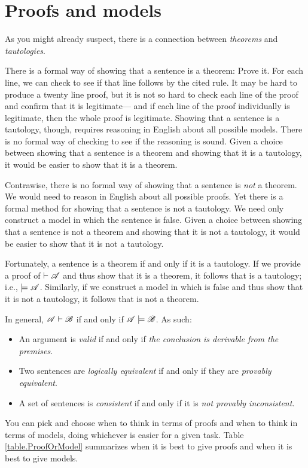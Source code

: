 \section{Proofs and models}
As you might already suspect, there is a connection between \emph{theorems} and \emph{tautologies}.

There is a formal way of showing that a sentence is a theorem: Prove it. For each line, we can check to see if that line follows by the cited rule. It may be hard to produce a twenty line proof, but it is not so hard to check each line of the proof and confirm that it is legitimate--- and if each line of the proof individually is legitimate, then the whole proof is legitimate. Showing that a sentence is a tautology, though, requires reasoning in English about all possible models. There is no formal way of checking to see if the reasoning is sound. Given a choice between showing that a sentence is a theorem and showing that it is a tautology, it would be easier to show that it is a theorem.

Contrawise, there is no formal way of showing that a sentence is \emph{not} a theorem. We would need to reason in English about all possible proofs. Yet there is a formal method for showing that a sentence is not a tautology. We need only construct a model in which the sentence is false. Given a choice between showing that a sentence is not a theorem and showing that it is not a tautology, it would be easier to show that it is not a tautology.

Fortunately, a sentence is a theorem if and only if it is a tautology. If we provide a proof of $\vdash\mathscr{A}$ and thus show that it is a theorem, it follows that  is a tautology; i.e., $\models\mathscr{A}$. Similarly, if we construct a model in which  is false and thus show that it is not a tautology, it follows that  is not a theorem.

In general, $\mathscr{A}\vdash\mathscr{B}$ if and only if $\mathscr{A}\models\mathscr{B}$. As such:
\begin{itemize}
\item An argument is \emph{valid} if and only if \emph{the conclusion is derivable from the premises}.
\item Two sentences are \emph{logically equivalent} if and only if they are \emph{provably equivalent}.
\item A set of sentences is \emph{consistent} if and only if it is \emph{not provably inconsistent}.
\end{itemize}
You can pick and choose when to think in terms of proofs and when to think in terms of models, doing whichever is easier for a given task. Table \ref{table.ProofOrModel} summarizes when it is best to give proofs and when it is best to give models.

